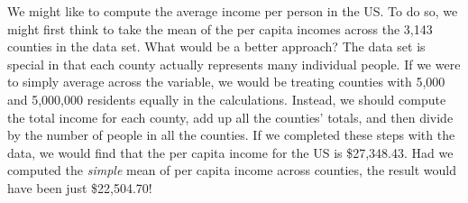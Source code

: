 
\begin{example}{We might like to compute the average income
    per person in the US. To do so, we might first think to take
    the mean of the per capita incomes across the 3,143 counties
    in the  data set. What would be a better approach?}
    \label{wtdMeanOfIncome}
  The  data set is special in that each county
  actually represents many individual people.
  If we were to simply average across the 
  variable, we would be treating counties with 5,000 and
  5,000,000 residents equally in the calculations.
  Instead, we should compute the total income for each county,
  add up all the counties' totals, and then divide by the number
  of people in all the counties.
  If we completed these steps with the  data,
  we would find that the per capita income for the US is
  \$27,348.43.
  Had we computed the \emph{simple} mean of per capita income
  across counties, the result would have been just \$22,504.70!
\end{example}

